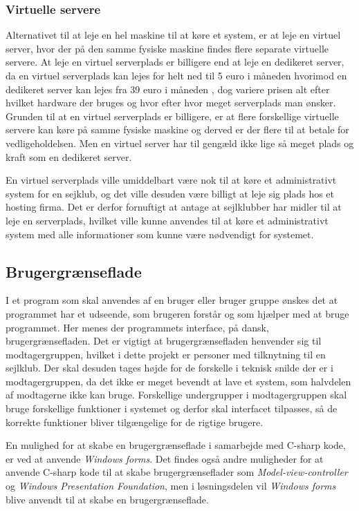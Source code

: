 \subsubsection*{Virtuelle servere}
Alternativet til at leje en hel maskine til at køre et system, er at leje en virtuel server, hvor der på den samme fysiske maskine findes flere separate virtuelle servere. At leje en virtuel serverplads er billigere end at leje en dedikeret server, da en virtuel serverplads kan lejes for helt ned til 5 euro i måneden\citep{Virtuelserver} hvorimod en dedikeret server kan lejes fra 39 euro i måneden \citep{Dedikeretserver}, dog variere prisen alt efter hvilket hardware der bruges og hvor efter hvor meget serverplads man ønsker. 
Grunden til at en virtuel serverplads er billigere, er at flere forskellige virtuelle servere kan køre på samme fysiske maskine og derved er der flere til at betale for vedligeholdelsen. 
Men en virtuel server har til gengæld ikke lige så meget plads og kraft som en dedikeret server. 

En virtuel serverplads ville umiddelbart være nok til at køre et administrativt system for en sejklub, og det ville desuden være billigt at leje sig plads hos et hosting firma. 
Det er derfor fornuftigt at antage at sejlklubber har midler til at leje en serverplads, hvilket ville kunne anvendes til at køre et administrativt system med alle informationer som kunne være nødvendigt for systemet. 
\subsection*{Brugergrænseflade}
I et program som skal anvendes af en bruger eller bruger gruppe ønskes det at programmet har et udseende, som brugeren forstår og som hjælper med at bruge programmet.
Her menes der programmets interface, på dansk, brugergrænsefladen.
Det er vigtigt at brugergrænsefladen henvender sig til modtagergruppen, hvilket i dette projekt er personer med tilknytning til en sejlklub.
Der skal desuden tages højde for de forskelle i teknisk snilde der er i modtagergruppen, da det ikke er meget bevendt at lave et system, som halvdelen af modtagerne ikke kan bruge.
Forskellige undergrupper i modtagergruppen skal bruge forskellige funktioner i systemet og derfor skal interfacet tilpasses, så de korrekte funktioner bliver tilgængelige for de rigtige brugere.

En mulighed for at skabe en brugergrænseflade i samarbejde med C-sharp kode, er ved at anvende \textit{Windows forms}. 
Det findes også andre muligheder for at anvende C-sharp kode til at skabe brugergrænseflader som \textit{Model-view-controller} og \textit{Windows Presentation Foundation}, men i løsningsdelen vil \textit{Windows forms} blive anvendt til at skabe en brugergrænseflade. 

